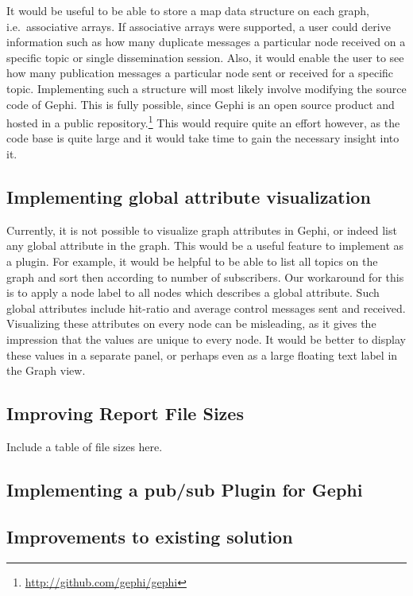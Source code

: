 It would be useful to be able to store a map data structure on each
graph, i.e.\ associative arrays. If associative arrays were supported,
a user could derive information such as how many duplicate messages a
particular node received on a specific topic or single dissemination
session. Also, it would enable the user to see how many publication messages a
particular node sent or received for a specific topic. Implementing such
a structure will most likely involve modifying the source code of Gephi.
This is fully possible, since Gephi is an open source product and hosted
in a public repository.\footnote{\url{http://github.com/gephi/gephi}}
This would require quite an effort however, as the code base is quite
large and it would take time to gain the necessary insight into it.

\subsection{Implementing global attribute visualization}

Currently, it is not possible to visualize graph attributes in Gephi, or
indeed list any global attribute in the graph. This would be a useful
feature to implement as a plugin. For example, it would be helpful to be
able to list all topics on the graph and sort then according to number
of subscribers. Our workaround for this is to apply a node label to all
nodes which describes a global attribute. Such global attributes include
hit-ratio and average control messages sent and received. Visualizing
these attributes on every node can be misleading, as it gives the
impression that the values are unique to every node. It would be better
to display these values in a separate panel, or perhaps even as a large
floating text label in the Graph view.

\subsection{Improving Report File Sizes}
Include a table of \gexf{} file sizes here.

\subsection{Implementing a pub/sub Plugin for Gephi}
\subsection{Improvements to existing solution}
